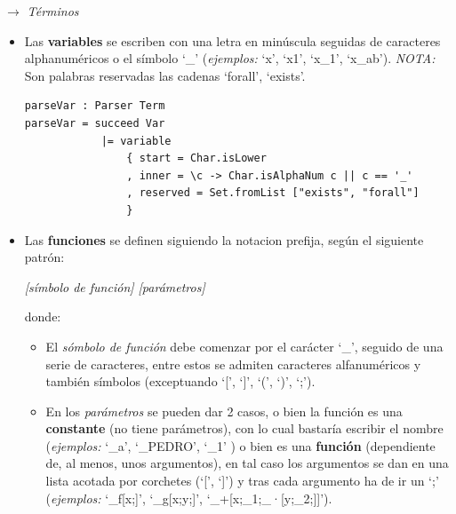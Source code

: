 \documentclass[a4paper]{report}
\begin{document}
\noindent $\longrightarrow$ \textit{Términos}
\begin{itemize}
\item Las \textbf{variables} se escriben con una letra en minúscula seguidas de caracteres alphanuméricos o el símbolo `\_' (\textit{ejemplos:} `x', `x1', `x\_1', `x\_ab'). \textit{NOTA:} Son palabras reservadas las cadenas `forall', `exists'.\\

\begin{lstlisting}[caption={ParserLPO. Definición de Variables.}, mathescape=true]
parseVar : Parser Term
parseVar = succeed Var
            |= variable
                { start = Char.isLower 
                , inner = \c -> Char.isAlphaNum c || c == '_'
                , reserved = Set.fromList ["exists", "forall"]
                }
\end{lstlisting}

\item Las \textbf{funciones}  se definen siguiendo la notacion prefija, según el siguiente patrón:
\begin{center}
\textit{[símbolo de función] [parámetros]}
\end{center}

donde:
\begin{itemize}
\item El \textit{sómbolo de función} debe comenzar por el carácter `\_', seguido de una serie de caracteres, entre estos se admiten caracteres alfanuméricos y también símbolos (exceptuando `[', `]', `(', `)', `;'). 
\item En los \textit{parámetros} se pueden dar 2 casos, o bien la función es una \textbf{constante} (no tiene parámetros), con lo cual bastaría escribir el nombre (\textit{ejemplos:} `\_a', `\_PEDRO', `\_1' ) o bien es una \textbf{función} (dependiente de, al menos, unos argumentos), en tal caso los argumentos se dan en una lista acotada por corchetes (`[', `]') y tras cada argumento ha de ir un `;' (\textit{ejemplos:} `\_f[x;]', `\_g[x;y;]', `\_+[x;\_1;\_·[y;\_2;]]').\\
\end{itemize}
\end{itemize}
\end{document}
